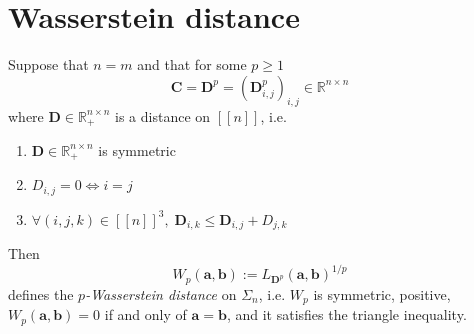 \section{Wasserstein distance}

\begin{proposition}
Suppose that $n=m$ and that for some $p \geq 1$
$$\mathbf{C} = \mathbf{D}^{p} = (\mathbf{D}^{p}_{i, j})_{i,j} \in \mathbb{R}^{n \times n}$$
where $\mathbf{D} \in \mathbb{R}^{n \times n}_{+}$ is a distance on $[[ n ]]$, i.e.
\begin{enumerate}
  \item $\mathbf{D} \in \mathbb{R}^{n \times n}_{+}$ is symmetric
  \item $D_{i, j} = 0 \iff i = j$
  \item $\forall (i, j, k) \in [[n]]^{3}, \; \mathbf{D}_{i,k} \leq \mathbf{D}_{i,j} + D_{j,k}$
\end{enumerate}
Then
$$
W_{p}(\mathbf{a}, \mathbf{b}) := L_{\mathbf{D}^{p}} (\mathbf{a}, \mathbf{b}) ^{1/p}
$$
defines the \textit{$p$-Wasserstein distance} on $\Sigma_{n}$,
i.e. $W_{p}$ is symmetric, positive, $W_{p}(\mathbf{a}, \mathbf{b}) = 0$
if and only of $\mathbf{a} = \mathbf{b}$, and it satisfies the triangle inequality.
\end{proposition}
